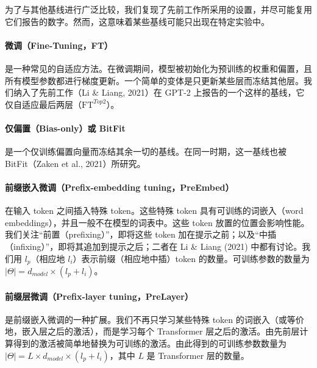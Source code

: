 \documentclass[11pt,UTF8,fontset=fandol]{ctexart}
\begin{document}
为了与其他基线进行广泛比较，我们复现了先前工作所采用的设置，并尽可能复用它们报告的数字。然而，这意味着某些基线可能只出现在特定实验中。

\paragraph{微调（Fine-Tuning，FT）}是一种常见的自适应方法。在微调期间，模型被初始化为预训练的权重和偏置，且所有模型参数都进行梯度更新。一个简单的变体是只更新某些层而冻结其他层。我们纳入了先前工作（Li \& Liang, 2021）在 GPT-2 上报告的一个这样的基线，它仅自适应最后两层（$\text{FT}^{Top2}$）。

\paragraph{仅偏置（Bias-only）或 BitFit}是一个仅训练偏置向量而冻结其余一切的基线。在同一时期，这一基线也被 BitFit（Zaken et al., 2021）所研究。

\paragraph{前缀嵌入微调（Prefix-embedding tuning，PreEmbed）}在输入 token 之间插入特殊 token。这些特殊 token 具有可训练的词嵌入（word embeddings），并且一般不在模型的词表中。这些 token 放置的位置会影响性能。我们关注“前置（prefixing）”，即将这些 token 加在提示之前；以及“中插（infixing）”，即将其追加到提示之后；二者在 Li \& Liang (2021) 中都有讨论。我们用 $l_p$（相应地 $l_i$）表示前缀（相应地中插）token 的数量。可训练参数的数量为 $|\Theta|=d_{model}\times(l_p+l_i)$。

\paragraph{前缀层微调（Prefix-layer tuning，PreLayer）}是前缀嵌入微调的一种扩展。我们不再只学习某些特殊 token 的词嵌入（或等价地，嵌入层之后的激活），而是学习每个 Transformer 层之后的激活。由先前层计算得到的激活被简单地替换为可训练的激活。由此得到的可训练参数数量为 $|\Theta|=L\times d_{model}\times(l_p+l_i)$，其中 $L$ 是 Transformer 层的数量。
\end{document}
